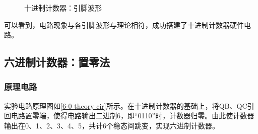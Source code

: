 \documentclass[UTF8]{ctexart}
\numberwithin{figure}{subsection}
\numberwithin{table}{subsection}
\numberwithin{equation}{subsection}
\begin{document}
\begin{figure}[H]
    \centering
    \caption{十进制计数器：引脚波形}
    \label{10 osci}
\end{figure}

\par 可以看到，电路现象与各引脚波形与理论相符，成功搭建了十进制计数器硬件电路。


\subsection{六进制计数器：置零法}
\subsubsection{原理电路}
\par 实验电路原理图如\ref{6-0 theory cir}所示。在十进制计数器的基础上，将QB、QC引回电路置零端，使得电路输出二进制6，即“0110”时，计数器归零。由此使计数器输出在0、1、2、3、4、5，共计6个稳态间跳变，实现六进制计数器。
\end{document}
